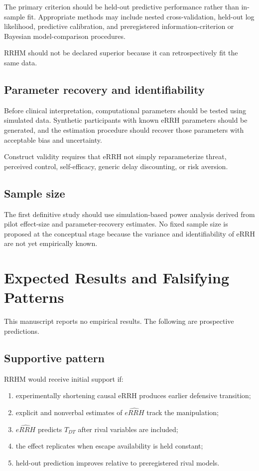 \documentclass[11pt]{article}
\begin{document}
The primary criterion should be held-out predictive performance rather than in-sample fit. Appropriate methods may include nested cross-validation, held-out log likelihood, predictive calibration, and preregistered information-criterion or Bayesian model-comparison procedures.

RRHM should not be declared superior because it can retrospectively fit the same data.

\subsection{Parameter recovery and identifiability}
Before clinical interpretation, computational parameters should be tested using simulated data. Synthetic participants with known eRRH parameters should be generated, and the estimation procedure should recover those parameters with acceptable bias and uncertainty.

Construct validity requires that eRRH not simply reparameterize threat, perceived control, self-efficacy, generic delay discounting, or risk aversion.

\subsection{Sample size}
The first definitive study should use simulation-based power analysis derived from pilot effect-size and parameter-recovery estimates. No fixed sample size is proposed at the conceptual stage because the variance and identifiability of eRRH are not yet empirically known.

\section{Expected Results and Falsifying Patterns}
This manuscript reports no empirical results. The following are prospective predictions.

\subsection{Supportive pattern}
RRHM would receive initial support if:
\begin{enumerate}[leftmargin=2em]
\item experimentally shortening causal eRRH produces earlier defensive transition;
\item explicit and nonverbal estimates of $\widehat{eRRH}$ track the manipulation;
\item $\widehat{eRRH}$ predicts $T_{DT}$ after rival variables are included;
\item the effect replicates when escape availability is held constant;
\item held-out prediction improves relative to preregistered rival models.
\end{enumerate}
\end{document}
